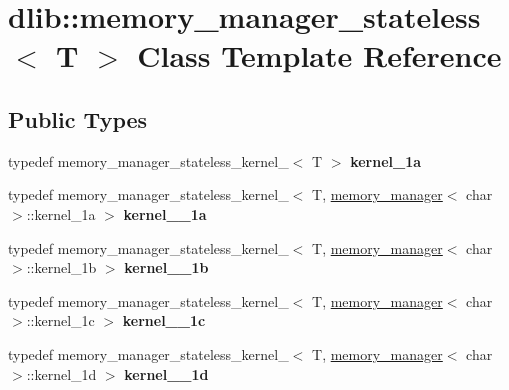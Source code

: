 \hypertarget{classdlib_1_1memory__manager__stateless}{
\section{dlib::memory\_\-manager\_\-stateless$<$ T $>$ Class Template Reference}
\label{classdlib_1_1memory__manager__stateless}
}
\subsection*{Public Types}
\begin{DoxyCompactItemize}
\item 
\hypertarget{classdlib_1_1memory__manager__stateless_a6922044a3487f460b8d3d6b73ee997bd}{
typedef memory\_\-manager\_\-stateless\_\-kernel\_$<$ T $>$ {\bfseries kernel\_\-1a}}
\label{classdlib_1_1memory__manager__stateless_a6922044a3487f460b8d3d6b73ee997bd}

\item 
\hypertarget{classdlib_1_1memory__manager__stateless_a65781c7bc3f4a7f0aae38dbc631b7c6a}{
typedef memory\_\-manager\_\-stateless\_\-kernel\_$<$ T, \hyperlink{classdlib_1_1memory__manager}{memory\_\-manager}$<$ char $>$::kernel\_\-1a $>$ {\bfseries kernel\_\_\-1a}}
\label{classdlib_1_1memory__manager__stateless_a65781c7bc3f4a7f0aae38dbc631b7c6a}

\item 
\hypertarget{classdlib_1_1memory__manager__stateless_a99b2b640195102d7289f99fc3cd0c084}{
typedef memory\_\-manager\_\-stateless\_\-kernel\_$<$ T, \hyperlink{classdlib_1_1memory__manager}{memory\_\-manager}$<$ char $>$::kernel\_\-1b $>$ {\bfseries kernel\_\_\-1b}}
\label{classdlib_1_1memory__manager__stateless_a99b2b640195102d7289f99fc3cd0c084}

\item 
\hypertarget{classdlib_1_1memory__manager__stateless_aa02cecf3547aa1ad580c53c4938ba241}{
typedef memory\_\-manager\_\-stateless\_\-kernel\_$<$ T, \hyperlink{classdlib_1_1memory__manager}{memory\_\-manager}$<$ char $>$::kernel\_\-1c $>$ {\bfseries kernel\_\_\-1c}}
\label{classdlib_1_1memory__manager__stateless_aa02cecf3547aa1ad580c53c4938ba241}

\item 
\hypertarget{classdlib_1_1memory__manager__stateless_a94a1314e37ca98cb19f18805399a81f2}{
typedef memory\_\-manager\_\-stateless\_\-kernel\_$<$ T, \hyperlink{classdlib_1_1memory__manager}{memory\_\-manager}$<$ char $>$::kernel\_\-1d $>$ {\bfseries kernel\_\_\-1d}}
\label{classdlib_1_1memory__manager__stateless_a94a1314e37ca98cb19f18805399a81f2}


\end{DoxyCompactItemize}
